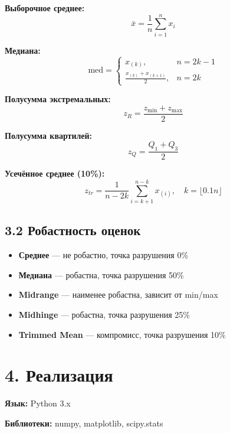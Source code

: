 \documentclass[a4paper,14pt]{extarticle}
\begin{document}
\textbf{Выборочное среднее:}
\begin{equation}
\bar{x} = \frac{1}{n}\sum_{i=1}^{n} x_i
\end{equation}

\textbf{Медиана:}
\begin{equation}
\text{med} = \begin{cases}
x_{(k)}, & n = 2k-1 \\
\frac{x_{(k)} + x_{(k+1)}}{2}, & n = 2k
\end{cases}
\end{equation}

\textbf{Полусумма экстремальных:}
\begin{equation}
z_R = \frac{z_{\min} + z_{\max}}{2}
\end{equation}

\textbf{Полусумма квартилей:}
\begin{equation}
z_Q = \frac{Q_1 + Q_3}{2}
\end{equation}

\textbf{Усечённое среднее (10\%):}
\begin{equation}
z_{tr} = \frac{1}{n-2k}\sum_{i=k+1}^{n-k} x_{(i)}, \quad k = \lfloor 0.1n \rfloor
\end{equation}

\subsection*{3.2 Робастность оценок}

\begin{itemize}
    \item \textbf{Среднее} — не робастно, точка разрушения 0\%
    \item \textbf{Медиана} — робастна, точка разрушения 50\%
    \item \textbf{Midrange} — наименее робастна, зависит от min/max
    \item \textbf{Midhinge} — робастна, точка разрушения 25\%
    \item \textbf{Trimmed Mean} — компромисс, точка разрушения 10\%
\end{itemize}

\section*{4. Реализация}

\textbf{Язык:} Python 3.x

\textbf{Библиотеки:} numpy, matplotlib, scipy.stats
\end{document}
